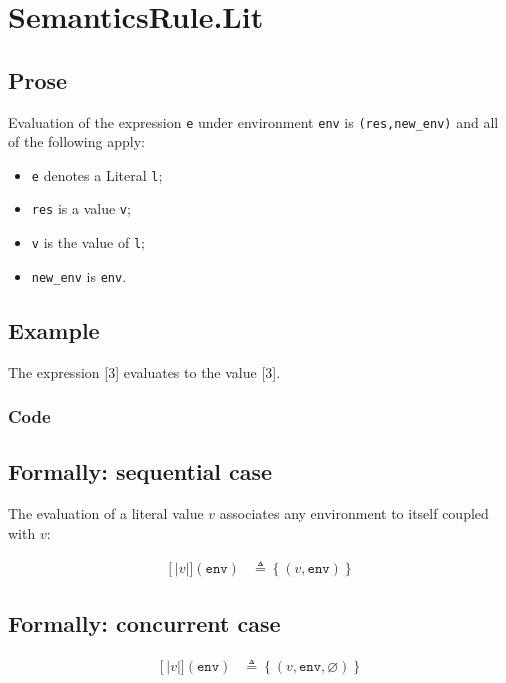 \documentclass{book}
\newcommand\llbracket{[|}
\newcommand\rrbracket{|]}
\newcommand\interp[1]{\left\llbracket #1 \right\rrbracket}
\begin{document}
\section{SemanticsRule.Lit \label{sec:SemanticsRule.Lit}}

  \subsection{Prose}
  Evaluation of the expression \texttt{e} under environment \texttt{env} is
  \texttt{(res,new\_env)} and all of the following apply:
  \begin{itemize}
  \item \texttt{e} denotes a Literal \texttt{l};
  \item \texttt{res} is a value \texttt{v};
  \item \texttt{v} is the value of \texttt{l};
  \item \texttt{new\_env} is \texttt{env}.
  \end{itemize}

  \subsection{Example}
  The expression [3] evaluates to the value [3].

  \subsubsection{Code}

  \subsection{Formally: sequential case}
  The evaluation of a literal value $v$ associates any environment to itself
  coupled with $v$: 

  \begin{align}
  \interp{v}(\texttt{env}) & \triangleq \left\{ (v, \texttt{env}) \right\}
  \label{eq:sem-seq-lit}
  \end{align}

  \subsection{Formally: concurrent case}
  \begin{align}
  \interp{v}(\texttt{env}) & \triangleq \left\{ (v, \texttt{env}, \varnothing) \right\}
  \label{eq:sem-conc-lit}
  \end{align}
\end{document}
